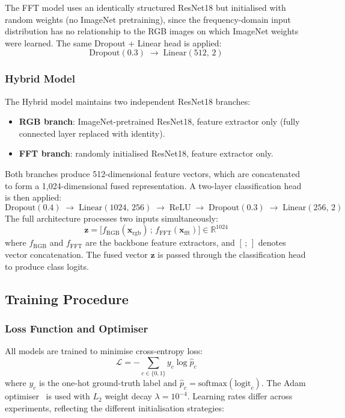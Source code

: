 \documentclass[12pt, a4paper]{article}
\begin{document}
The FFT model uses an identically structured ResNet18 but initialised with
random weights (no ImageNet pretraining), since the frequency-domain input
distribution has no relationship to the RGB images on which ImageNet weights
were learned.  The same Dropout + Linear head is applied:
\[
  \text{Dropout}(0.3) \;\rightarrow\; \text{Linear}(512,\,2)
\]

\subsubsection{Hybrid Model}

The Hybrid model maintains two independent ResNet18 branches:
\begin{itemize}[leftmargin=1.8em]
  \item \textbf{RGB branch}: ImageNet-pretrained ResNet18, feature extractor
    only (fully connected layer replaced with identity).
  \item \textbf{FFT branch}: randomly initialised ResNet18, feature extractor
    only.
\end{itemize}
Both branches produce 512-dimensional feature vectors, which are
concatenated to form a 1,024-dimensional fused representation.  A two-layer
classification head is then applied:
\[
  \text{Dropout}(0.4)
  \;\rightarrow\; \text{Linear}(1024,\,256)
  \;\rightarrow\; \text{ReLU}
  \;\rightarrow\; \text{Dropout}(0.3)
  \;\rightarrow\; \text{Linear}(256,\,2)
\]
The full architecture processes two inputs simultaneously:
\[
  \mathbf{z} = \bigl[f_{\text{RGB}}(\mathbf{x}_{\text{rgb}})\,;
                      \,f_{\text{FFT}}(\mathbf{x}_{\text{fft}})\bigr]
             \in \mathbb{R}^{1024}
\]
where $f_{\text{RGB}}$ and $f_{\text{FFT}}$ are the backbone feature
extractors, and $[\,;\,]$ denotes vector concatenation.  The fused vector
$\mathbf{z}$ is passed through the classification head to produce class
logits.

\subsection{Training Procedure}
\label{sec:training}

\subsubsection{Loss Function and Optimiser}

All models are trained to minimise cross-entropy loss:
\[
  \mathcal{L} = -\sum_{c \in \{0,1\}} y_c \log \hat{p}_c
\]
where $y_c$ is the one-hot ground-truth label and $\hat{p}_c = \text{softmax}
(\text{logit}_c)$.  The Adam optimiser~\cite{kingma2015adam} is used with
$L_2$ weight decay $\lambda = 10^{-4}$.  Learning rates differ across
experiments, reflecting the different initialisation strategies:
\end{document}
